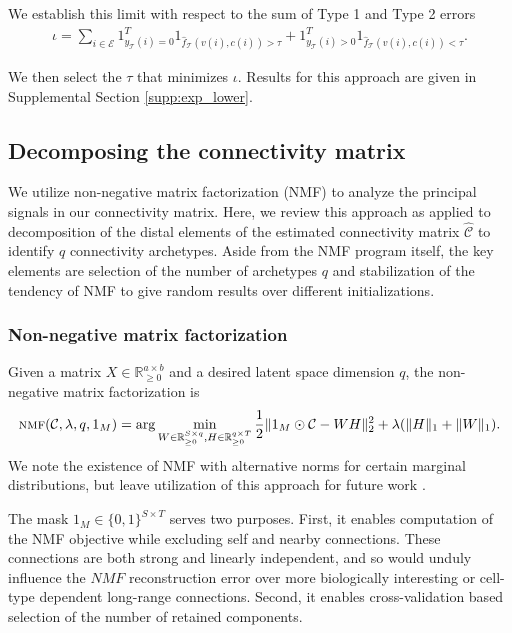 We establish this limit with respect to the sum of Type 1 and Type 2 errors
\begin{eqnarray*}
\iota = \sum_{i \in \mathcal E} 1_{y_{\mathcal T}(i) = 0}^T 1_{\hat f_{\mathcal T}(v(i),c(i)) > \tau} + 1_{y_{\mathcal T}(i) > 0}^T 1_{\hat f_{\mathcal T}(v(i),c(i)) < \tau}  .
\end{eqnarray*}

We then select the $\tau$ that minimizes $\iota$.
Results for this approach are given in Supplemental Section \ref{supp:exp_lower}.

\newpage

\subsection{Decomposing the connectivity matrix}
\label{supp_sec:matrix_factor_methods}

We utilize non-negative matrix factorization (NMF) to analyze the principal signals in our connectivity matrix.
Here, we review this approach as applied to decomposition of the distal elements of the estimated connectivity matrix $\widehat {\mathcal C}$ to identify $q$ connectivity archetypes.
Aside from the NMF program itself, the key elements are selection of the number of archetypes $q$ and stabilization of the tendency of NMF to give random results over different initializations. 

\subsubsection{Non-negative matrix factorization}

Given a matrix $X \in \mathbb R_{\geq 0}^{a \times b}$ and a desired latent space dimension $q$, the non-negative matrix factorization is
\begin{eqnarray*}
\textsc{nmf} (\mathcal C, \lambda, q,1_{M}) = \arg \min_{W \in \mathbb R_{\geq 0}^{S \times q}, H\in \mathbb R_{\geq 0}^{q \times T}} \frac{1}{2}\| 1_{M} \odot \mathcal C - WH\|_2^2  + \lambda  (\|H \|_1 + \|W \|_1) .
\end{eqnarray*}
We note the existence of NMF with alternative norms for certain marginal distributions, but leave utilization of this approach for future work \citep{Brunet2004-gi}.

The mask $1_M \in \{0,1\}^{S \times T}$ serves two purposes.
First, it enables computation of the NMF objective while excluding self and nearby connections.
These connections are both strong and linearly independent, and so would unduly influence the $NMF$ reconstruction error over more biologically interesting or cell-type dependent long-range connections.
Second, it enables cross-validation based selection of the number of retained components.

